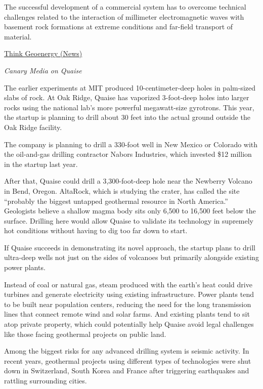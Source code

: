 \documentclass[
]{book}
\begin{document}
The successful development of a commercial system has to overcome technical challenges related to the interaction of millimeter electromagnetic waves with basement rock formations at extreme conditions and far-field transport of material.

\href{https://www.thinkgeoenergy.com/research-partnership-to-explore-ultra-deep-geothermal-drilling/}{Think Geoenergy (News)}

\emph{Canary Media on Quaise}

The earlier experiments at MIT produced 10-centimeter-deep holes in palm-sized slabs of rock. At Oak Ridge, Quaise has vaporized 3-foot-deep holes into larger rocks using the national lab's more powerful megawatt-size gyrotrons. This year, the startup is planning to drill about 30 feet into the actual ground outside the Oak Ridge facility.

The company is planning to drill a 330-foot well in New Mexico or Colorado with the oil-and-gas drilling contractor Nabors Industries, which invested \$12 million in the startup last year.

After that, Quaise could drill a 3,300-foot-deep hole near the Newberry Volcano in Bend, Oregon. AltaRock, which is studying the crater, has called the site \hspace{0pt}``probably the biggest untapped geothermal resource in North America.'' Geologists believe a shallow magma body sits only 6,500 to 16,500 feet below the surface. Drilling here would allow Quaise to validate its technology in supremely hot conditions without having to dig too far down to start.

If Quaise succeeds in demonstrating its novel approach, the startup plans to drill ultra-deep wells not just on the sides of volcanoes but primarily alongside existing power plants.

Instead of coal or natural gas, steam produced with the earth's heat could drive turbines and generate electricity using existing infrastructure. Power plants tend to be built near population centers, reducing the need for the long transmission lines that connect remote wind and solar farms. And existing plants tend to sit atop private property, which could potentially help Quaise avoid legal challenges like those facing geothermal projects on public land.

Among the biggest risks for any advanced drilling system is seismic activity. In recent years, geothermal projects using different types of technologies were shut down in Switzerland, South Korea and France after triggering earthquakes and rattling surrounding cities.
\end{document}
